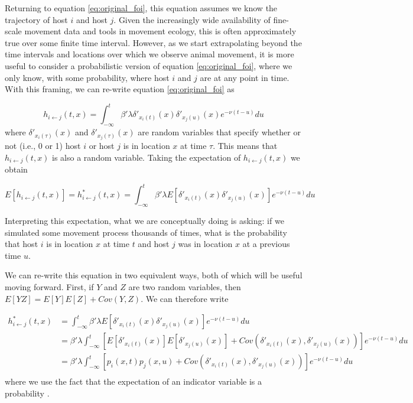 \documentclass[letterpaper]{article}
\begin{document}
Returning to equation \ref{eq:original_foi}, this equation assumes we know the trajectory of host $i$ and host $j$.  Given the increasingly wide availability of fine-scale movement data and tools in movement ecology, this is often approximately true over some finite time interval. However, as we start extrapolating beyond the time intervals and locations over which we observe animal movement, it is more useful to consider a probabilistic version of equation \ref{eq:original_foi}, where we only know, with some probability, where host $i$ and $j$ are at any point in time. With this framing, we can re-write equation \ref{eq:original_foi} as

\begin{equation}
    h_{i \leftarrow j}(t, x) = \int_{-\infty}^{t} \beta' \lambda \delta'_{x_i(t)}(x) \delta'_{x_j(u)}(x) e^{-\nu(t - u)} du
    \label{eq:prob_foi}
\end{equation}
where $\delta'_{x_i(\tau)}(x)$ and $\delta'_{x_j(\tau)}(x)$ are random variables that specify whether or not (i.e., 0 or 1) host $i$ or host $j$ is in location $x$ at time $\tau$.  This means that $h_{i \leftarrow j}(t, x)$ is also a random variable. Taking the expectation of $h_{i \leftarrow j}(t, x)$ we obtain

\begin{equation}
    E[h_{i \leftarrow j}(t, x)] = h^*_{i \leftarrow j}(t, x) = \int_{-\infty}^{t} \beta' \lambda E[\delta'_{x_i(t)}(x) \delta'_{x_j(u)}(x)] e^{-\nu(t - u)} du
    \label{eq:expected_foi}
\end{equation}

Interpreting this expectation, what we are conceptually doing is asking: if we simulated some movement process thousands of times, what is the probability that host $i$ is in location $x$ at time $t$ and host $j$ was in location $x$ at a previous time $u$. 

We can re-write this equation in two equivalent ways, both of which will be useful moving forward.  First, if $Y$ and $Z$ are two random variables, then $E[YZ] = E[Y]E[Z] + Cov(Y, Z)$.  We can therefore write

\begin{equation}
    \begin{aligned}
        h^*_{i \leftarrow j}(t, x) &= \int_{-\infty}^{t} \beta' \lambda E[\delta'_{x_i(t)}(x) \delta'_{x_j(u)}(x)] e^{-\nu(t - u)} du \\
        &= \beta' \lambda \int_{-\infty}^{t} [E[\delta'_{x_i(t)}(x)] E[\delta'_{x_j(u)}(x)] + Cov(\delta'_{x_i(t)}(x), \delta'_{x_j(u)}(x))] e^{-\nu(t - u)} du \\
        &= \beta' \lambda \int_{-\infty}^{t} [p_i(x, t) p_j(x, u) + Cov(\delta'_{x_i(t)}(x), \delta'_{x_j(u)}(x))] e^{-\nu(t - u)} du \\
    \end{aligned}
    \label{eq:foi_cov}
\end{equation}
where we use the fact that the expectation of an indicator variable is a probability \citep{Grimmett2001}.
\end{document}
